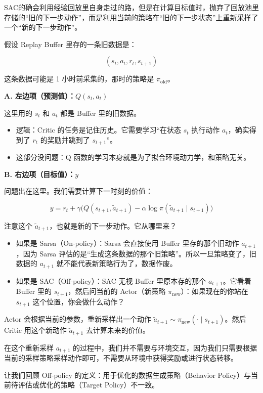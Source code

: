 SAC的确会利用经验回放里自身走过的路，但是在计算目标值时，抛弃了回放池里存储的``旧的下一步动作''，而是利用当前的策略在``旧的下一步状态''上重新采样了一个``新的下一步动作''。

假设 Replay Buffer 里存的一条旧数据是：

\[
(s_t,a_t,r_t,s_{t+1})
\]

这条数据可能是 1 小时前采集的，那时的策略是 \(\pi_{\mathrm{old}}\)。

\textbf{A. 左边项（预测值）：\(Q(s_t,a_t)\)}

这里用的 \(s_t\) 和 \(a_t\) 都是 Buffer 里的旧数据。

\begin{itemize}
\tightlist
\item
  逻辑：Critic 的任务是记住历史。它需要学习``在状态 \(s_t\) 执行动作 \(a_t\)，确实得到了 \(r_t\) 的奖励并跳到了 \(s_{t+1}\)''。
\item
  这部分没问题：Q 函数的学习本身就是为了拟合环境动力学，和策略无关。
\end{itemize}

\textbf{B. 右边项（目标值）：\(y\)}

问题出在这里。我们需要计算下一时刻的价值：

\[
y
=
r_t
+
\gamma
\bigl(
Q(s_{t+1},\tilde{a}_{t+1})
-
\alpha\log\pi(\tilde{a}_{t+1}\mid s_{t+1})
\bigr)
\]

注意这个 \(\tilde{a}_{t+1}\)，也就是新的下一步动作。它从哪里来？

\begin{itemize}
\tightlist
\item
  如果是 Sarsa（On-policy）：Sarsa 会直接使用 Buffer 里存的那个旧动作 \(a_{t+1}\)，因为 Sarsa 评估的是``生成这条数据的那个旧策略''。所以一旦策略变了，旧数据的 \(a_{t+1}\) 就不能代表新策略行为了，数据作废。
\item
  如果是 SAC（Off-policy）：SAC 无视 Buffer 里原本存的那个 \(a_{t+1}\)。它看着 Buffer 里的 \(s_{t+1}\)，然后问当前的 Actor（新策略 \(\pi_{\mathrm{new}}\)）：如果现在的你站在 \(s_{t+1}\) 这个位置，你会做什么动作？
\end{itemize}

Actor 会根据当前的参数，重新采样出一个动作 \(\tilde{a}_{t+1}\sim\pi_{\mathrm{new}}(\cdot\mid s_{t+1})\)。然后 Critic 用这个新动作 \(\tilde{a}_{t+1}\) 去计算未来的价值。

在这个重新采样 \(a_{t+1}\) 的过程中，我们并不需要与环境交互，因为我们只需要根据当前的采样策略采样动作即可，不需要从环境中获得奖励或进行状态转移。

让我们回顾 Off-policy 的定义：用于优化的数据生成策略（Behavior Policy）与当前待评估或优化的策略（Target Policy）不一致。

